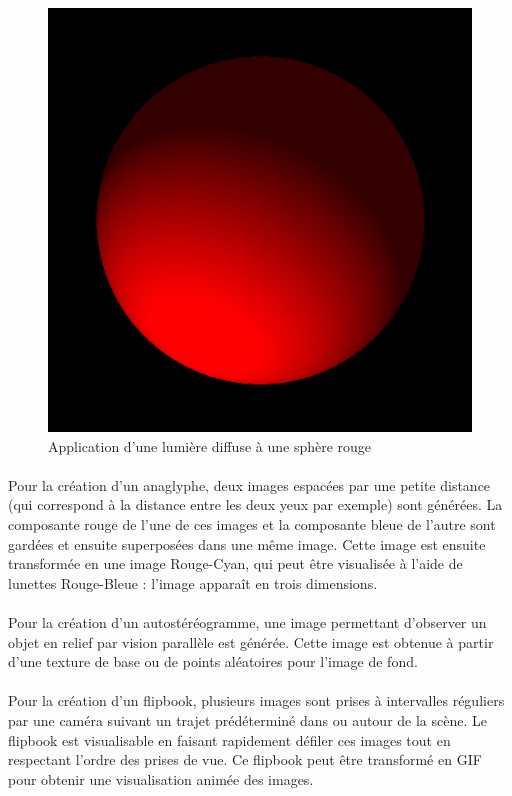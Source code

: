 \begin{figure}[h]
	\centering
	\includegraphics[scale=0.3]{boule.png}
	\caption{\label{fig:sphère} Application d’une lumière diffuse à une sphère rouge \protect \footnotemark }
\end{figure}

\paragraph{}
	Pour la création d’un anaglyphe, deux images espacées par une petite distance (qui correspond à la distance entre les deux yeux par exemple) sont générées. La composante rouge de l’une de ces images et la composante bleue de l’autre sont gardées et ensuite superposées dans une même image. Cette image est ensuite transformée en une image Rouge-Cyan, qui peut être visualisée à l’aide de lunettes Rouge-Bleue : l’image apparaît en trois dimensions.

\paragraph{}
	Pour la création d’un autostéréogramme, une image permettant d'observer un objet en relief par vision parallèle est générée. Cette image est obtenue à partir d'une texture de base ou de points aléatoires pour l'image de fond.

\paragraph{}
	Pour la création d’un flipbook, plusieurs images sont prises à intervalles réguliers par une caméra suivant un trajet prédéterminé dans ou autour de la scène. Le flipbook est visualisable en faisant rapidement défiler ces images tout en respectant l’ordre des prises de vue. Ce flipbook peut être transformé en GIF pour obtenir une visualisation animée des images.
